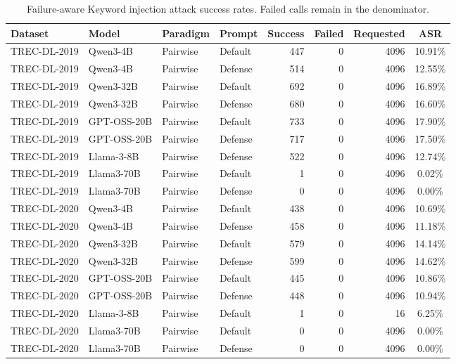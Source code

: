 \begin{table}[t]
\centering
\small
\setlength{\tabcolsep}{4pt}
\caption{Failure-aware Keyword injection attack success rates. Failed calls remain in the denominator.}
\label{tab:attack-failure-aware-keyword-injection}
\begin{tabular}{ll l l r r r c}
\toprule
\textbf{Dataset} & \textbf{Model} & \textbf{Paradigm} & \textbf{Prompt} & \textbf{Success} & \textbf{Failed} & \textbf{Requested} & \textbf{ASR} \\
\midrule
TREC-DL-2019 & Qwen3-4B & Pairwise & Default & 447 & 0 & 4096 & 10.91\% \\
TREC-DL-2019 & Qwen3-4B & Pairwise & Defense & 514 & 0 & 4096 & 12.55\% \\
TREC-DL-2019 & Qwen3-32B & Pairwise & Default & 692 & 0 & 4096 & 16.89\% \\
TREC-DL-2019 & Qwen3-32B & Pairwise & Defense & 680 & 0 & 4096 & 16.60\% \\
TREC-DL-2019 & GPT-OSS-20B & Pairwise & Default & 733 & 0 & 4096 & 17.90\% \\
TREC-DL-2019 & GPT-OSS-20B & Pairwise & Defense & 717 & 0 & 4096 & 17.50\% \\
TREC-DL-2019 & Llama-3-8B & Pairwise & Defense & 522 & 0 & 4096 & 12.74\% \\
TREC-DL-2019 & Llama3-70B & Pairwise & Default & 1 & 0 & 4096 & 0.02\% \\
TREC-DL-2019 & Llama3-70B & Pairwise & Defense & 0 & 0 & 4096 & 0.00\% \\
TREC-DL-2020 & Qwen3-4B & Pairwise & Default & 438 & 0 & 4096 & 10.69\% \\
TREC-DL-2020 & Qwen3-4B & Pairwise & Defense & 458 & 0 & 4096 & 11.18\% \\
TREC-DL-2020 & Qwen3-32B & Pairwise & Default & 579 & 0 & 4096 & 14.14\% \\
TREC-DL-2020 & Qwen3-32B & Pairwise & Defense & 599 & 0 & 4096 & 14.62\% \\
TREC-DL-2020 & GPT-OSS-20B & Pairwise & Default & 445 & 0 & 4096 & 10.86\% \\
TREC-DL-2020 & GPT-OSS-20B & Pairwise & Defense & 448 & 0 & 4096 & 10.94\% \\
TREC-DL-2020 & Llama-3-8B & Pairwise & Default & 1 & 0 & 16 & 6.25\% \\
TREC-DL-2020 & Llama3-70B & Pairwise & Default & 0 & 0 & 4096 & 0.00\% \\
TREC-DL-2020 & Llama3-70B & Pairwise & Defense & 0 & 0 & 4096 & 0.00\% \\
\bottomrule
\end{tabular}
\end{table}
